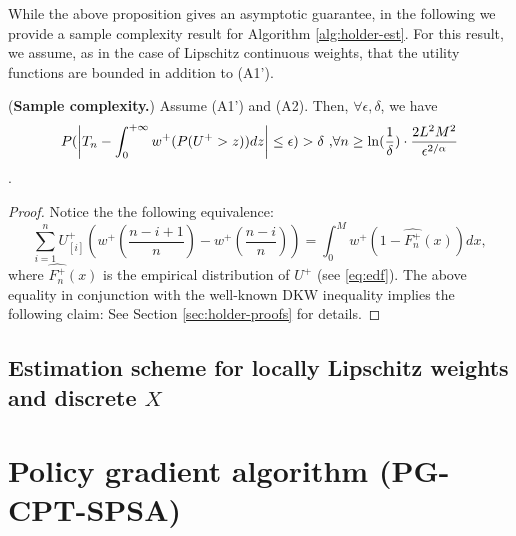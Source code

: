 \documentclass[11pt,letterpaper,english]{article}
\begin{document}
While the above proposition gives an asymptotic guarantee, in the following we provide a sample complexity result for Algorithm \ref{alg:holder-est}.
For this result, we assume, as in the case of Lipschitz continuous weights, that the utility functions are bounded in addition to (A1').

\begin{proposition}(\textbf{Sample complexity.})
\label{prop:holder-dkw}
Assume (A1') and (A2). Then, $\forall \epsilon, \delta$, we have
$$
P(\left |T_n- \int_0^{+\infty} w^+(P(U^+>z)) dz \right| \leq  \epsilon ) > \delta\text{     ,} \forall n \geq \ln(\frac{1}{\delta})\cdot 
\frac{2L^2 M^2}{\epsilon^{2/\alpha}}
$$
.
\end{proposition}
\begin{proof}
Notice the the following equivalence:
$$\sum_{i=1}^n U^+_{[i]} (w^+(\frac{n-i+1}{n}) - w^+(\frac{n-i}{n})) =  \int_0^M w^+(1-\hat{F^+_n}(x)) dx, $$
where $\hat{F^+_n}(x)$ is the empirical distribution of $U^+$ (see \eqref{eq:edf}).
The above equality in conjunction with the well-known DKW inequality implies the following claim:
See Section \ref{sec:holder-proofs} for details.
\end{proof}




\subsection{Estimation scheme for locally Lipschitz weights and discrete $X$}

\section{Policy gradient algorithm (PG-CPT-SPSA)}
\label{sec:1spsa}
\end{document}
